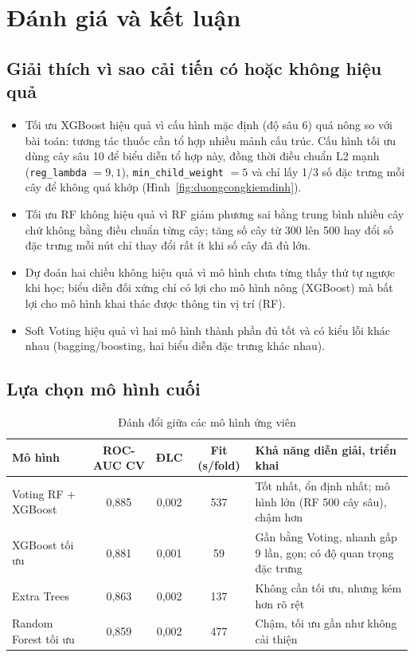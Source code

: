 \documentclass[12pt,a4paper,oneside]{report}
\begin{document}
\section{Đánh giá và kết luận}
\label{sec:chonmodel}

\subsection{Giải thích vì sao cải tiến có hoặc không hiệu quả}
\begin{itemize}
  \item Tối ưu XGBoost hiệu quả vì cấu hình mặc định (độ sâu 6) quá nông so
        với bài toán: tương tác thuốc cần tổ hợp nhiều mảnh cấu trúc. Cấu hình tối ưu
        dùng cây sâu 10 để biểu diễn tổ hợp này, đồng thời điều chuẩn L2 mạnh
        (\texttt{reg\_lambda} $= 9{,}1$), \texttt{min\_child\_weight} $= 5$ và chỉ lấy
        1/3 số đặc trưng mỗi cây để không quá khớp (Hình~\ref{fig:duongcongkiemdinh}).
  \item Tối ưu RF không hiệu quả vì RF giảm phương sai bằng trung bình nhiều
        cây chứ không bằng điều chuẩn từng cây; tăng số cây từ 300 lên 500 hay đổi số
        đặc trưng mỗi nút chỉ thay đổi rất ít khi số cây đã đủ lớn.
  \item Dự đoán hai chiều không hiệu quả vì mô hình chưa từng thấy thứ tự
        ngược khi học; biểu diễn đối xứng chỉ có lợi cho mô hình nông
        (XGBoost) mà bất lợi cho mô hình khai thác được thông tin vị trí (RF).
  \item Soft Voting hiệu quả vì hai mô hình thành phần đủ tốt và có kiểu lỗi
        khác nhau (bagging/boosting, hai biểu diễn đặc trưng khác nhau).
\end{itemize}

\subsection{Lựa chọn mô hình cuối}
\begin{table}[H]
  \centering
  \caption{Đánh đổi giữa các mô hình ứng viên}
  \label{tab:chonmohinh}
  \small
  \begin{tabularx}{\textwidth}{l c c c >{\raggedright\arraybackslash}X}
    \toprule
    \textbf{Mô hình} & \textbf{ROC-AUC CV} & \textbf{ĐLC} & \textbf{Fit (s/fold)} & \textbf{Khả năng diễn giải, triển khai} \\
    \midrule
    Voting RF + XGBoost & 0,885 & 0,002 & 537 & Tốt nhất, ổn định nhất; mô hình lớn (RF 500 cây sâu), chậm hơn \\
    XGBoost tối ưu & 0,881 & 0,001 & 59 & Gần bằng Voting, nhanh gấp 9 lần, gọn; có độ quan trọng đặc trưng \\
    Extra Trees & 0,863 & 0,002 & 137 & Không cần tối ưu, nhưng kém hơn rõ rệt \\
    Random Forest tối ưu & 0,859 & 0,002 & 477 & Chậm, tối ưu gần như không cải thiện \\
    \bottomrule
  \end{tabularx}
\end{table}
\end{document}
